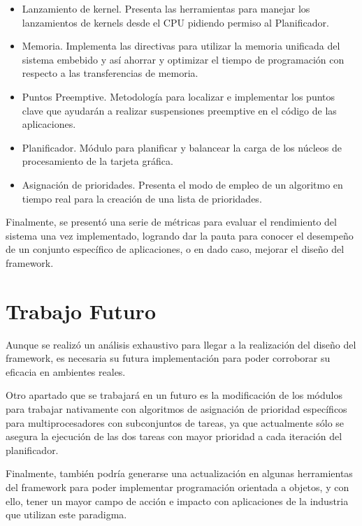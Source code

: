 \begin{itemize}
\item Lanzamiento de kernel. Presenta las herramientas para manejar los lanzamientos de kernels desde el CPU pidiendo permiso al Planificador.
\item Memoria. Implementa las directivas para utilizar la memoria unificada del sistema embebido y así ahorrar y optimizar el tiempo de programación con respecto a las transferencias de memoria.
\item Puntos Preemptive. Metodología para localizar e implementar los puntos clave que ayudarán a realizar suspensiones preemptive en el código de las aplicaciones.
\item Planificador. Módulo para planificar y balancear la carga de los núcleos de procesamiento de la tarjeta gráfica. 
\item Asignación de prioridades. Presenta el modo de empleo de un algoritmo en tiempo real para la creación de una lista de prioridades.
\end{itemize}

Finalmente, se presentó una serie de métricas para evaluar el rendimiento del sistema una vez implementado, logrando dar la pauta para conocer el desempeño de un conjunto específico de aplicaciones, o en dado caso, mejorar el diseño del framework.

\section{Trabajo Futuro}
Aunque se realizó un análisis exhaustivo para llegar a la  realización del diseño del framework, es necesaria su futura implementación para poder corroborar su eficacia en ambientes reales.

Otro apartado que se trabajará en un futuro es la modificación de los módulos para trabajar nativamente con algoritmos de asignación de prioridad específicos para multiprocesadores con subconjuntos de tareas, ya que actualmente sólo se asegura la ejecución de las dos tareas con mayor prioridad a cada iteración del planificador.  

Finalmente, también podría generarse una actualización en algunas herramientas del framework para poder implementar programación orientada a objetos, y con ello, tener un mayor campo de acción e impacto con aplicaciones de la industria que utilizan este paradigma. 